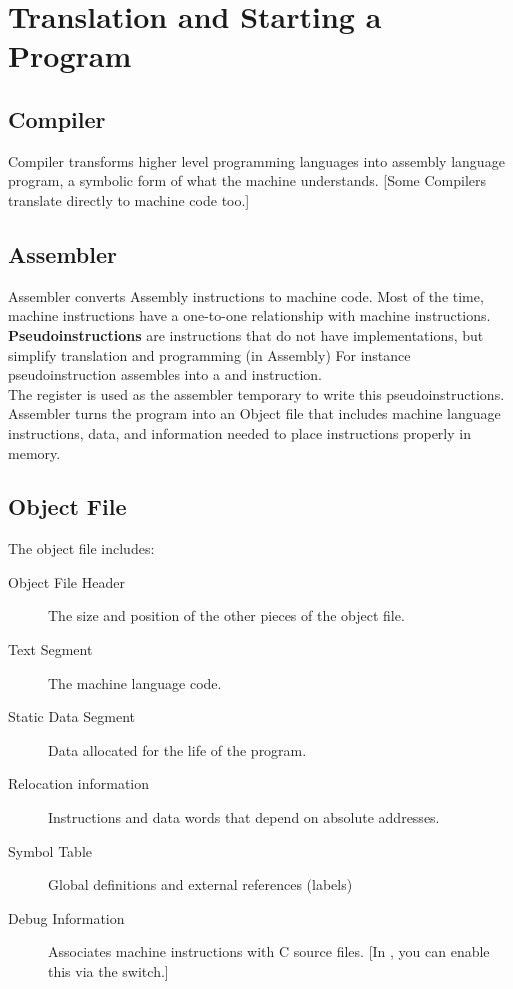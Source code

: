 \documentclass[11pt,a4paper,twocolumn]{book}
\begin{document}
\section{Translation and Starting a Program}

\subsection{Compiler}

Compiler transforms higher level programming languages into assembly language program, a symbolic form of what the machine understands. [Some Compilers translate directly to machine code too.]

\subsection{Assembler}

Assembler converts Assembly instructions to machine code. Most of the time, machine instructions have a one-to-one relationship with machine instructions. \textbf{Pseudoinstructions} are instructions that do not have implementations, but simplify translation and programming (in Assembly) For instance  pseudoinstruction assembles into a  and  instruction.\\

The  register is used as the assembler temporary to write this pseudoinstructions.\\

Assembler turns the program into an Object file that includes machine language instructions, data, and information needed to place instructions properly in memory.

\subsection{Object File}

The object file includes:

\begin{description}
\item[Object File Header] The size and position of the other pieces of the object file.
\item[Text Segment] The machine language code.
\item[Static Data Segment] Data allocated for the life of the program.
\item[Relocation information] Instructions and data words that depend on absolute addresses.
\item[Symbol Table] Global definitions and external references (labels)
\item[Debug Information] Associates machine instructions with C source files. [In , you can enable this via the  switch.]
\end{description}
\end{document}
